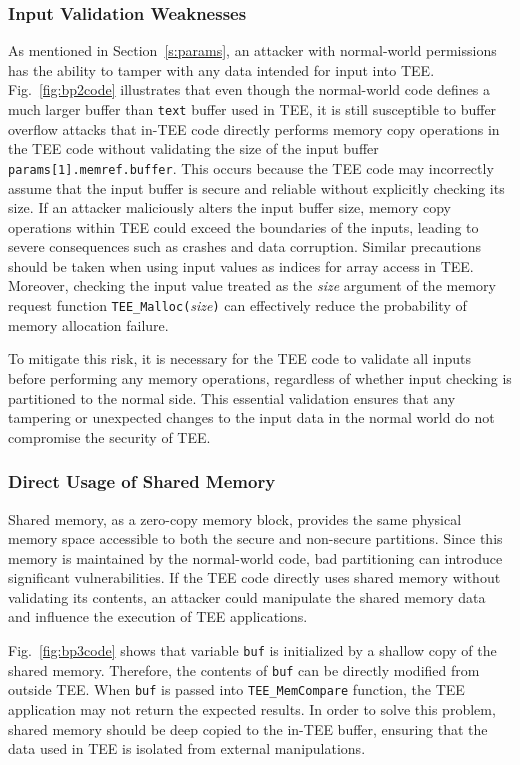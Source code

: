 \subsubsection{\textbf{Input Validation Weaknesses}} \label{s:ivw}
As mentioned in Section~\ref{s:params}, an attacker with normal-world permissions has the ability to tamper with any data intended for input into TEE. Fig.~\ref{fig:bp2code} illustrates that even though the normal-world code defines a much larger buffer than \texttt{text} buffer used in TEE, it is still susceptible to buffer overflow attacks that in-TEE code directly performs memory copy operations in the TEE code without validating the size of the input buffer \texttt{params[1].memref.buffer}. This occurs because the TEE code may incorrectly assume that the input buffer is secure and reliable without explicitly checking its size. If an attacker maliciously alters the input buffer size, memory copy operations within TEE could exceed the boundaries of the inputs, leading to severe consequences such as crashes and data corruption. Similar precautions should be taken when using input values as indices for array access in TEE. Moreover, checking the input value treated as the \textit{size} argument of the memory request function \texttt{TEE\_Malloc(}\textit{size}\texttt{)} can effectively reduce the probability of memory allocation failure.

To mitigate this risk, it is necessary for the TEE code to validate all inputs before performing any memory operations, regardless of whether input checking is partitioned to the normal side. This essential validation ensures that any tampering or unexpected changes to the input data in the normal world do not compromise the security of TEE.

\subsubsection{\textbf{Direct Usage of Shared Memory}} \label{s:dusm}
Shared memory, as a zero-copy memory block, provides the same physical memory space accessible to both the secure and non-secure partitions. Since this memory is maintained by the normal-world code, bad partitioning can introduce significant vulnerabilities. If the TEE code directly uses shared memory without validating its contents, an attacker could manipulate the shared memory data and influence the execution of TEE applications.

Fig.~\ref{fig:bp3code} shows that variable \texttt{buf} is initialized by a shallow copy of the shared memory. Therefore, the contents of \texttt{buf} can be directly modified from outside TEE. When \texttt{buf} is passed into \texttt{TEE\_MemCompare} function, the TEE application may not return the expected results. In order to solve this problem, shared memory should be deep copied to the in-TEE buffer, ensuring that the data used in TEE is isolated from external manipulations. 
